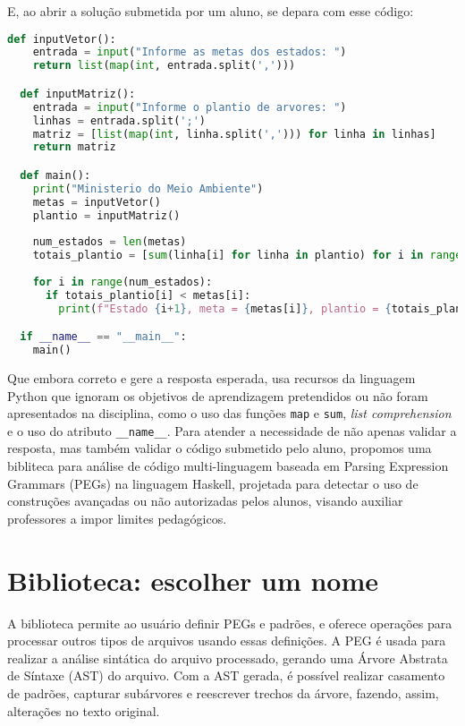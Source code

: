 \documentclass[12pt]{article}
\begin{document}
E, ao abrir a solução submetida por um aluno, se depara com esse código:

\begin{lstlisting}[language=Python, breaklines]
  def inputVetor():
    entrada = input("Informe as metas dos estados: ")
    return list(map(int, entrada.split(',')))

  def inputMatriz():
    entrada = input("Informe o plantio de arvores: ")
    linhas = entrada.split(';')
    matriz = [list(map(int, linha.split(','))) for linha in linhas]
    return matriz

  def main():
    print("Ministerio do Meio Ambiente")
    metas = inputVetor()
    plantio = inputMatriz()
    
    num_estados = len(metas)
    totais_plantio = [sum(linha[i] for linha in plantio) for i in range(num_estados)]
    
    for i in range(num_estados):
      if totais_plantio[i] < metas[i]:
        print(f"Estado {i+1}, meta = {metas[i]}, plantio = {totais_plantio[i]}")

  if __name__ == "__main__":
    main()
\end{lstlisting}

Que embora correto e gere a resposta esperada, usa recursos da linguagem Python 
que ignoram os objetivos de aprendizagem pretendidos ou não foram apresentados 
na disciplina, como o uso das funções \texttt{map} e \texttt{sum}, 
\textit{list comprehension} e o uso do atributo \texttt{\_\_name\_\_}.
Para atender a necessidade de não apenas validar a resposta, mas também validar
o código submetido pelo aluno, propomos uma bibliteca para análise de código 
multi-linguagem baseada em Parsing Expression Grammars (PEGs)\cite{ford2004-peg} 
na linguagem Haskell, projetada para detectar o uso de construções avançadas ou não 
autorizadas pelos alunos, visando auxiliar professores a impor limites pedagógicos.


\section{Biblioteca: escolher um nome}

A biblioteca permite ao usuário definir PEGs e padrões, e oferece operações 
para processar outros tipos de arquivos usando essas definições. A PEG é usada
para realizar a análise sintática do arquivo processado, gerando uma Árvore
Abstrata de Síntaxe (AST) do arquivo. Com a AST gerada, é possível realizar
casamento de padrões, capturar subárvores e reescrever trechos da árvore,
fazendo, assim, alterações no texto original.
\end{document}

